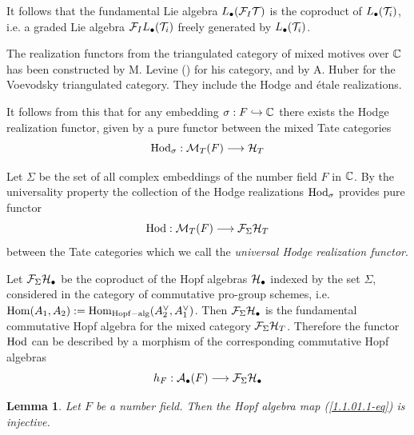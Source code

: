 \documentclass[10pt]{article}
\newtheorem{lemma}[theorem]{Lemma}
\begin{document}
It follows that  the fundamental Lie algebra 
$L_{\bullet}({\cal F}_{I}{\cal T})$ is the coproduct of $L_{\bullet}({\cal T}_i)$, i.e. a graded 
Lie algebra ${\cal F}_{I}L_{\bullet}({\cal T}_i)$ freely generated by $L_{\bullet}({\cal T}_i)$. 

The realization functors from the triangulated 
category of mixed motives over ${\mathbb C}$ has been constructed by M. Levine (\cite{L}) 
for his category, 
and by A. Huber \cite{Hu} for the Voevodsky triangulated category. 
They include the Hodge and \'etale realizations. 


It follows from this that for any embedding $\sigma: F \hookrightarrow {\mathbb C}$ 
there exists the Hodge realization functor, given by 
a pure functor between the mixed Tate categories 
$$
{\rm Hod}_{\sigma}: {\cal M}_T(F) \longrightarrow {\cal H}_T
$$


 Let $\Sigma$ be the set of all complex 
embeddings of the number field $F$ in  ${\mathbb C}$. 
By the universality property the 
 collection of the Hodge realizations ${\rm Hod}_{\sigma}$  provides  pure functor 
$$
{\rm Hod}: {\cal M}_T(F) \longrightarrow {\cal F}_{\Sigma}{\cal H}_T
$$
between the Tate categories 
which we call the {\it universal Hodge realization functor}. 

Let ${\cal F}_{\Sigma}{\cal H}_{\bullet }$ be the coproduct of the Hopf algebras 
${\cal H}_{\bullet}$ indexed by the set $\Sigma$, considered 
in the category of commutative pro-group schemes, 
i.e. ${\rm Hom}(A_1, A_2) := {\rm Hom}_{{\rm Hopf}-{\rm  alg}}(A_2^{\vee}, A_1^{\vee})$. 
Then ${\cal F}_{\Sigma}{\cal H}_{\bullet }$ is the fundamental commutative Hopf algebra 
for the mixed category ${\cal F}_{\Sigma}{\cal H}_T$. Therefore the functor 
${\rm Hod}$
  can be described by a morphism of the corresponding commutative Hopf algebras 
\begin{equation} \label{1.1.01.1-eq}
h_F: {\cal A}_{\bullet}(F) \longrightarrow {\cal F}_{\Sigma} {\cal H}_{\bullet }
\end{equation}

\begin{lemma} \label{1.1.01.2} Let $F$ be a number field. Then 
the Hopf algebra map (\ref{1.1.01.1-eq}) is injective. 
\end{lemma}
\end{document}
